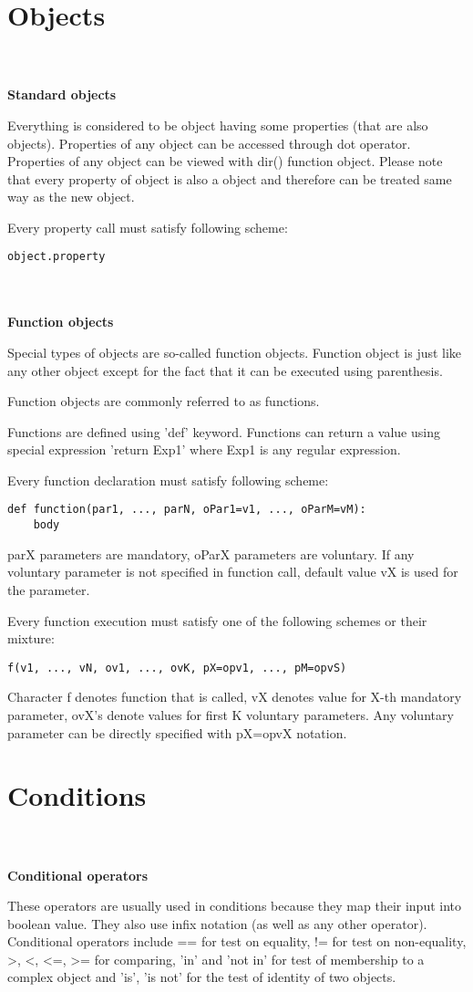\documentclass[11pt,oneside]{fithesis2}
\newcommand{\markit}[1]{\ \\\\{\noindent\textbf{#1}}}
\begin{document}
\section{Objects}
\markit{Standard objects}

Everything is considered to be object having some properties (that are also objects). Properties of any object can be accessed through dot operator. Properties of any object can be viewed with dir() function object. Please note that every property of object is also a object and therefore can be treated same way as the new object.

Every property call must satisfy following scheme:
\begin{lstlisting}
object.property
\end{lstlisting}
\markit{Function objects}

Special types of objects are so-called function objects. Function object is just like any other object except for the fact that it can be executed using parenthesis.

Function objects are commonly referred to as functions.

Functions are defined using 'def' keyword. Functions can return a value using special expression 'return Exp1' where Exp1 is any regular expression.

Every function declaration must satisfy following scheme:
\begin{lstlisting}
def function(par1, ..., parN, oPar1=v1, ..., oParM=vM):
    body
\end{lstlisting}
parX parameters are mandatory, oParX parameters are voluntary.
If any voluntary parameter is not specified in function call, default value vX is used for the parameter.

Every function execution must satisfy one of the following schemes or their mixture:
\begin{lstlisting}
f(v1, ..., vN, ov1, ..., ovK, pX=opv1, ..., pM=opvS)
\end{lstlisting}
Character f denotes function that is called, vX denotes value for X-th mandatory parameter, ovX's denote values for first K voluntary parameters. Any voluntary parameter can be directly specified with pX=opvX notation.

\section{Conditions}
\markit{Conditional operators}

These operators are usually used in conditions because they map their input into boolean value. They also use infix notation (as well as any other operator). Conditional operators include == for test on equality, != for test on non-equality, >, <, <=, >= for comparing, 'in' and 'not in' for test of membership to a complex object and 'is', 'is not' for the test of identity of two objects.
\end{document}
